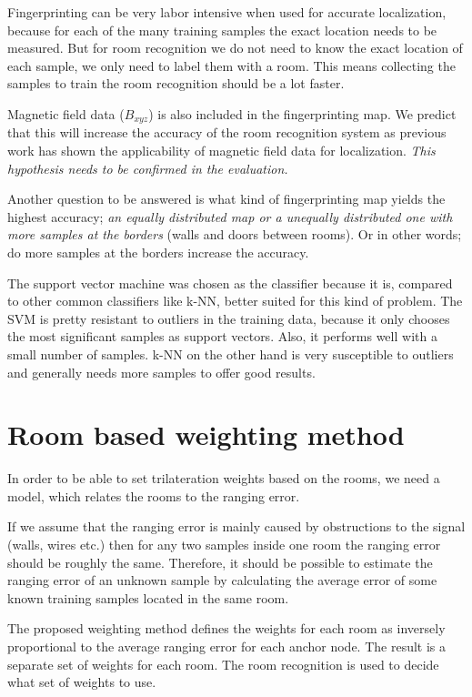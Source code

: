 Fingerprinting can be very labor intensive when used for accurate localization, because for each of the many training samples the exact location needs to be measured. But for room recognition we do not need to know the exact location of each sample, we only need to label them with a room. This means collecting the samples to train the room recognition should be a lot faster.

Magnetic field data ($B_{xyz}$) is also included in the fingerprinting map. We predict that this will increase the accuracy of the room recognition system as previous work has shown the applicability of magnetic field data for localization. \emph{This hypothesis needs to be confirmed in the evaluation.}

Another question to be answered is what kind of fingerprinting map yields the highest accuracy; \emph{an equally distributed map or a unequally distributed one with more samples at the borders }(walls and doors between rooms). Or in other words; do more samples at the borders increase the accuracy.

The support vector machine was chosen as the classifier because it is, compared to other common classifiers like k-NN, better suited for this kind of problem. The SVM is pretty resistant to outliers in the training data, because it only chooses the most significant samples as support vectors. Also, it performs well with a small number of samples. k-NN on the other hand is very susceptible to outliers and generally needs more samples to offer good results.

\section{Room based weighting method}
\label{WeightingModelDefinition}
In order to be able to set trilateration weights based on the rooms, we need a model, which relates the rooms to the ranging error.

If we assume that the ranging error is mainly caused by obstructions to the signal (walls, wires etc.) then for any two samples inside one room the ranging error should be roughly the same. Therefore, it should be possible to estimate the ranging error of an unknown sample by calculating the average error of some known training samples located in the same room.

The proposed weighting method defines the weights for each room as inversely proportional to the average ranging error for each anchor node. The result is a separate set of weights for each room. The room recognition is used to decide what set of weights to use.

